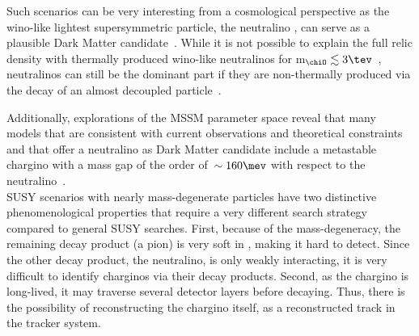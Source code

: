 Such scenarios can be very interesting from a cosmological perspective as the wino-like lightest supersymmetric particle, the neutralino \chiO, can serve as a plausible Dark Matter candidate~\cite{bib:Ibe:DarkMatter_2015,bib:Hisano:DarkMatter_2005}.
While it is not possible to explain the full relic density with thermally produced wino-like neutralinos for m$_{\chiO}\lesssim 3\tev$~\cite{bib:IndirectSearches_Cohen_2013}, neutralinos can still be the dominant part if they are non-thermally produced via the decay of an almost decoupled particle~\cite{bib:Moroi:DarkMatter_1999,bib:Moroi:DarkMatter_2013}.

Additionally, explorations of the MSSM parameter space reveal that many models that are consistent with current observations and theoretical constraints and that offer a neutralino as Dark Matter candidate include a metastable chargino with a mass gap of the order of~$\sim160\mev$ with respect to the neutralino~\cite{bib:pMSSMScan_2013}.\\


SUSY scenarios with nearly mass-degenerate particles have two distinctive phenomenological properties that require a very different search strategy compared to general SUSY searches. 
First, because of the mass-degeneracy, the remaining decay product (\eg a pion) is very soft in \pt, making it hard to detect.
Since the other decay product, the neutralino, is only weakly interacting, it is very difficult to identify charginos via their decay products. 
Second, as the chargino is long-lived, it may traverse several detector layers before decaying.
Thus, there is the possibility of reconstructing the chargino itself, \eg as a reconstructed track in the tracker system.\\

